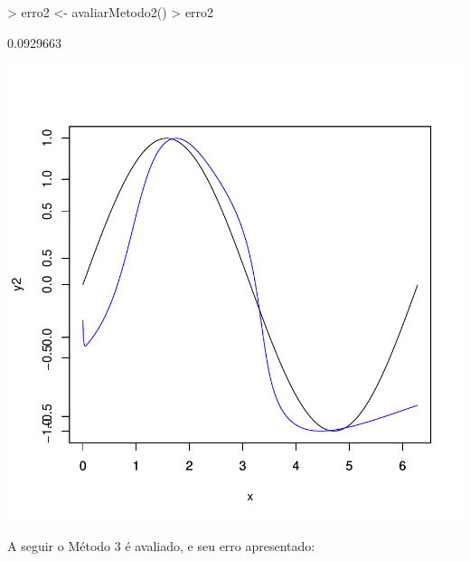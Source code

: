 \documentclass{article}
\begin{document}
\begin{Schunk}
\begin{Sinput}
>   erro2 <- avaliarMetodo2()
>   erro2
\end{Sinput}
\begin{Soutput}
[1] 0.0929663
\end{Soutput}
\end{Schunk}
\includegraphics{mlppacotes-005}

A seguir o Método 3 é avaliado, e seu erro apresentado:
\end{document}
